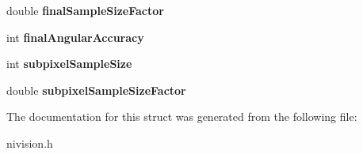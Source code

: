 \begin{DoxyCompactItemize}
\item 
\hypertarget{structLearnPatternAdvancedRotationOptions__struct_a6c00f323c465ca7808138eb02dd57147}{
double {\bfseries finalSampleSizeFactor}}
\label{structLearnPatternAdvancedRotationOptions__struct_a6c00f323c465ca7808138eb02dd57147}

\item 
\hypertarget{structLearnPatternAdvancedRotationOptions__struct_af43cac1c172e5ec6df93e0deb62a8413}{
int {\bfseries finalAngularAccuracy}}
\label{structLearnPatternAdvancedRotationOptions__struct_af43cac1c172e5ec6df93e0deb62a8413}

\item 
\hypertarget{structLearnPatternAdvancedRotationOptions__struct_a79ee7067d09ba7aa36b8438dbb24971d}{
int {\bfseries subpixelSampleSize}}
\label{structLearnPatternAdvancedRotationOptions__struct_a79ee7067d09ba7aa36b8438dbb24971d}

\item 
\hypertarget{structLearnPatternAdvancedRotationOptions__struct_a7e2308c024331b076735ca9443d7dd00}{
double {\bfseries subpixelSampleSizeFactor}}
\label{structLearnPatternAdvancedRotationOptions__struct_a7e2308c024331b076735ca9443d7dd00}

\end{DoxyCompactItemize}


The documentation for this struct was generated from the following file:\begin{DoxyCompactItemize}
\item 
nivision.h\end{DoxyCompactItemize}
